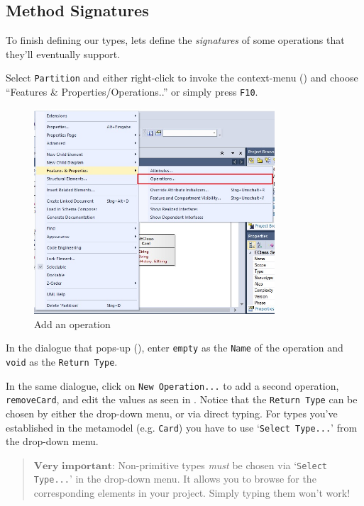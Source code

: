 \newpage
\subsection{Method Signatures}
\genHeader
\hypertarget{static:methods vis}{}

To finish defining our types, lets define the \emph{signatures} of some operations that they'll eventually support.

\begin{stepbystep}

\item  Select \texttt{Partition} and either right-click to invoke the context-menu ()  and choose ``Features \&
Properties/Operations..'' or simply press \texttt{F10}.

\begin{figure}[htbp]
	\centering
  \includegraphics[width=0.8\textwidth]{../../org.moflon.doc.handbook.02_leitnersLearningBox/2_staticSemantics/4_creatingMethods/cmVisImages/ea_contextAddOperation}
	\caption{Add an operation}
	\label{ea:add_operation}
\end{figure}
\FloatBarrier

\item  In the dialogue that pops-up (), enter \texttt{empty} as the \texttt{Name} of the operation and \texttt{void} as the \texttt{Return Type}.

\vspace{0.5cm}

\item  In the same dialogue, click on \texttt{New Operation...} to add a second operation, \texttt{removeCard}, and edit the values as seen in 
. Notice that the \texttt{Return Type} can be chosen by either the drop-down menu, or via direct typing. For types you've established in
the metamodel (e.g. \texttt{Card}) you have to use `\texttt{Select Type...}' from the drop-down menu.
\vspace{-.3cm}
\begin{quote}
{ \small
$\textbf{Very important:}$ Non-primitive types \emph{must} be chosen via `\texttt{Select Type...}' in the drop-down menu. It allows you to browse for the corresponding elements in
your project. Simply typing them won't work!
}
\end{quote}


\end{stepbystep}
